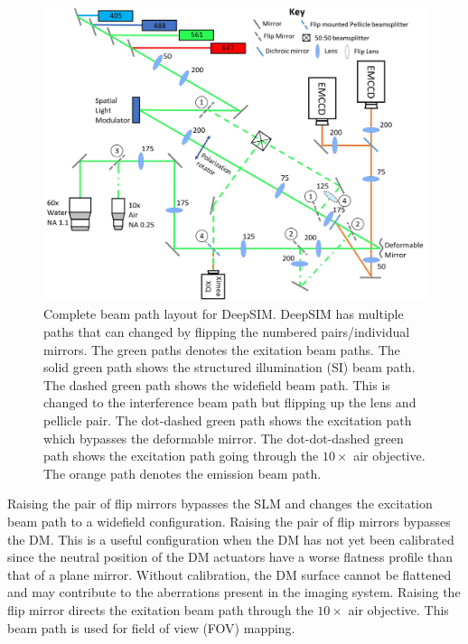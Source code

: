 \begin{figure}[h]
	\centering
	\includegraphics[width=\textwidth]{images/DeepSIM_complete_beam_paths.jpg}
	\caption{Complete beam path layout for DeepSIM. DeepSIM has multiple paths that can changed by flipping the numbered pairs/individual mirrors. The green paths denotes the exitation beam paths. The solid green path shows the structured illumination (SI) beam path. The dashed green path shows the widefield beam path. This is changed to the interference beam path but flipping up the lens and pellicle pair. The dot-dashed green path shows the excitation path which bypasses the deformable mirror. The dot-dot-dashed green path shows the excitation path going through the $10\times$ air objective. The orange path denotes the emission beam path.}
	\label{fig:DeepSIM_complete_beam_paths}
\end{figure}
	
Raising the  pair of flip mirrors bypasses the SLM and changes the excitation beam path to a widefield configuration. Raising the  pair of flip mirrors bypasses the DM. This is a useful configuration when the DM has not yet been calibrated since the neutral position of the DM actuators have a worse flatness profile than that of a plane mirror. Without calibration, the DM surface cannot be flattened and may contribute to the aberrations present in the imaging system. Raising the  flip mirror directs the exitation beam path through the $10 \times$ air objective. This beam path is used for field of view (FOV) mapping.



